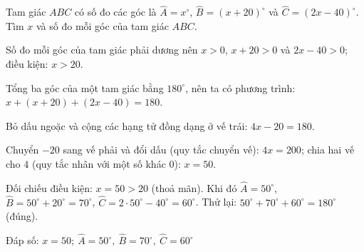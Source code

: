 \begin{problem}[8DS-PT1-021]
Tam giác $ABC$ có số đo các góc là $\widehat{A} = x^\circ$, $\widehat{B} = (x + 20)^\circ$ và $\widehat{C} = (2x - 40)^\circ$. Tìm $x$ và số đo mỗi góc của tam giác $ABC$.

\begin{solution}
Số đo mỗi góc của tam giác phải dương nên $x > 0$, $x + 20 > 0$ và $2x - 40 > 0$; điều kiện: $x > 20$.

Tổng ba góc của một tam giác bằng $180^\circ$, nên ta có phương trình: $x + (x + 20) + (2x - 40) = 180$.

Bỏ dấu ngoặc và cộng các hạng tử đồng dạng ở vế trái: $4x - 20 = 180$.

Chuyển $-20$ sang vế phải và đổi dấu (quy tắc chuyển vế): $4x = 200$; chia hai vế cho $4$ (quy tắc nhân với một số khác $0$): $x = 50$.

Đối chiếu điều kiện: $x = 50 > 20$ (thoả mãn). Khi đó $\widehat{A} = 50^\circ$, $\widehat{B} = 50^\circ + 20^\circ = 70^\circ$, $\widehat{C} = 2 \cdot 50^\circ - 40^\circ = 60^\circ$. Thử lại: $50^\circ + 70^\circ + 60^\circ = 180^\circ$ (đúng).

Đáp số: $\boxed{x = 50;\ \widehat{A} = 50^\circ,\ \widehat{B} = 70^\circ,\ \widehat{C} = 60^\circ}$
\end{solution}
\end{problem}

